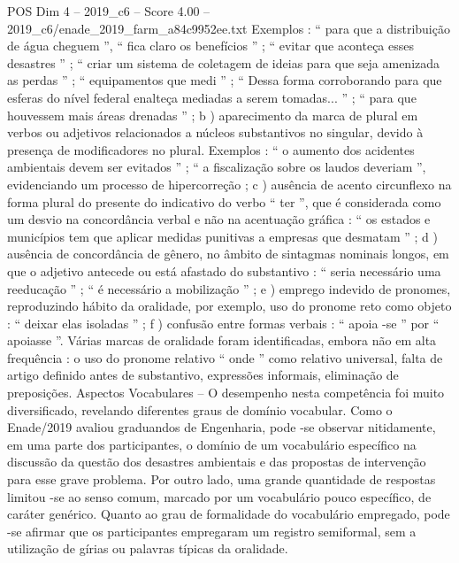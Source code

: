 \begin{textsample}{POS Dim 4 – 2019\_c6 – Score 4.00 – 2019\_c6/enade\_2019\_farm\_a84c9952ee.txt}
Exemplos : “ para que a distribuição de água cheguem ”, “ fica claro os benefícios ” ; “ evitar que aconteça esses desastres ” ; “ criar um sistema de coletagem de ideias para que seja amenizada as perdas ” ; “ equipamentos que medi ” ; “ Dessa forma corroborando para que esferas do nível federal enalteça mediadas a serem tomadas... ” ; “ para que houvessem mais áreas drenadas ” ; b ) aparecimento da marca de plural em verbos ou adjetivos relacionados a núcleos substantivos no singular, devido à presença de modificadores no plural.
Exemplos : “ o aumento dos acidentes ambientais devem ser evitados ” ; “ a fiscalização sobre os laudos deveriam ”, evidenciando um processo de hipercorreção ; c ) ausência de acento circunflexo na forma plural do presente do indicativo do verbo “ ter ”, que é considerada como um desvio na concordância verbal e não na acentuação gráfica : “ os estados e municípios tem que aplicar medidas punitivas a empresas que desmatam ” ; d ) ausência de concordância de gênero, no âmbito de sintagmas nominais longos, em que o adjetivo antecede ou está afastado do substantivo : “ seria necessário uma reeducação ” ; “ é necessário a mobilização ” ; e ) emprego indevido de pronomes, reproduzindo hábito da oralidade, por exemplo, uso do pronome reto como objeto : “ deixar elas isoladas ” ; f ) confusão entre formas verbais : “ apoia -se ” por “ apoiasse ”.
Várias marcas de oralidade foram identificadas, embora não em alta frequência : o uso do pronome relativo “ onde ” como relativo universal, falta de artigo definido antes de substantivo, expressões informais, eliminação de preposições.
Aspectos Vocabulares – O desempenho nesta competência foi muito diversificado, revelando diferentes graus de domínio vocabular.
Como o Enade/2019 avaliou graduandos de Engenharia, pode -se observar nitidamente, em uma parte dos participantes, o domínio de um vocabulário específico na discussão da questão dos desastres ambientais e das propostas de intervenção para esse grave problema.
Por outro lado, uma grande quantidade de respostas limitou -se ao senso comum, marcado por um vocabulário pouco específico, de caráter genérico.
Quanto ao grau de formalidade do vocabulário empregado, pode -se afirmar que os participantes empregaram um registro semiformal, sem a utilização de gírias ou palavras típicas da oralidade.

\end{textsample}
